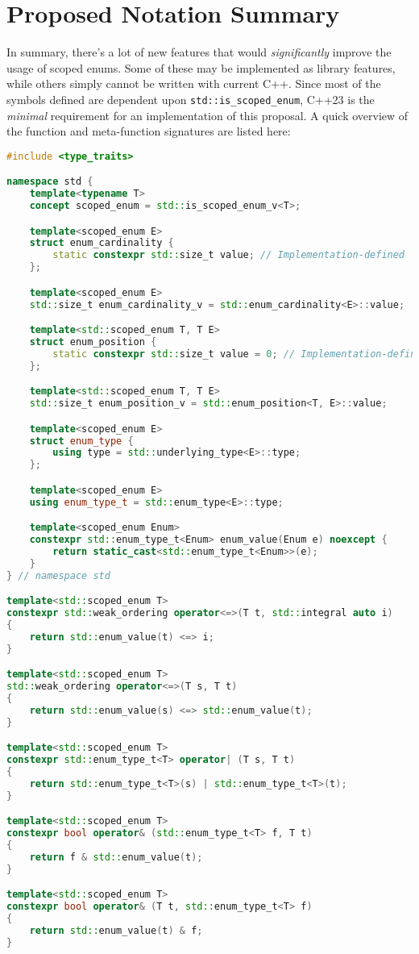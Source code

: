 \documentclass[
  format=manuscript,
  screen=true,
  review=false,
  nonacm=true,
  timestamp=true,
  balance=false]{acmart}
\begin{document}
\section{Proposed Notation Summary}

In summary, there's a lot of new features that would \textit{significantly} improve
the usage of scoped enums. Some of these may be implemented as library features,
while others simply cannot be written with current C++. Since most of the symbols
defined are dependent upon \texttt{std::is\_scoped\_enum}, C++23 is the
\textit{minimal} requirement for an implementation of this proposal. A quick overview
of the function and meta-function signatures are listed here:\vspace{2mm}

\begin{lstlisting}[language=Cpp]
#include <type_traits>

namespace std {
    template<typename T>
    concept scoped_enum = std::is_scoped_enum_v<T>;

    template<scoped_enum E>
    struct enum_cardinality {
        static constexpr std::size_t value; // Implementation-defined
    };

    template<scoped_enum E>
    std::size_t enum_cardinality_v = std::enum_cardinality<E>::value;

    template<std::scoped_enum T, T E>
    struct enum_position {
        static constexpr std::size_t value = 0; // Implementation-defined
    };

    template<std::scoped_enum T, T E>
    std::size_t enum_position_v = std::enum_position<T, E>::value;

    template<scoped_enum E>
    struct enum_type {
        using type = std::underlying_type<E>::type;
    };

    template<scoped_enum E>
    using enum_type_t = std::enum_type<E>::type;

    template<scoped_enum Enum>
    constexpr std::enum_type_t<Enum> enum_value(Enum e) noexcept {
        return static_cast<std::enum_type_t<Enum>>(e);
    }
} // namespace std

template<std::scoped_enum T>
constexpr std::weak_ordering operator<=>(T t, std::integral auto i)
{
    return std::enum_value(t) <=> i;
}

template<std::scoped_enum T>
std::weak_ordering operator<=>(T s, T t)
{
    return std::enum_value(s) <=> std::enum_value(t);
}

template<std::scoped_enum T>
constexpr std::enum_type_t<T> operator| (T s, T t)
{
    return std::enum_type_t<T>(s) | std::enum_type_t<T>(t);
}

template<std::scoped_enum T>
constexpr bool operator& (std::enum_type_t<T> f, T t)
{
    return f & std::enum_value(t);
}

template<std::scoped_enum T>
constexpr bool operator& (T t, std::enum_type_t<T> f)
{
    return std::enum_value(t) & f;
}
\end{lstlisting}
\end{document}
